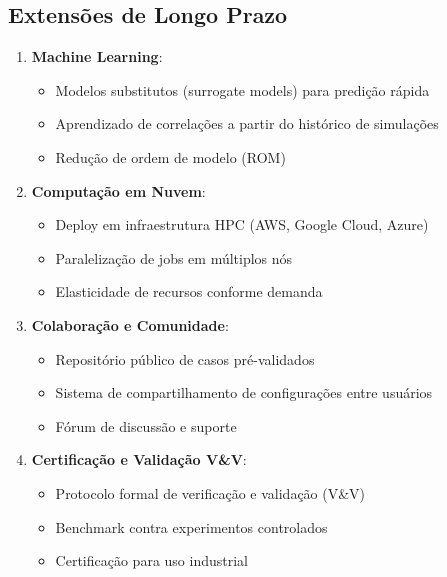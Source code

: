 \subsection{Extensões de Longo Prazo}

\begin{enumerate}
    \item \textbf{Machine Learning}:
    \begin{itemize}
        \item Modelos substitutos (surrogate models) para predição rápida
        \item Aprendizado de correlações a partir do histórico de simulações
        \item Redução de ordem de modelo (ROM)
    \end{itemize}
    
    \item \textbf{Computação em Nuvem}:
    \begin{itemize}
        \item Deploy em infraestrutura HPC (AWS, Google Cloud, Azure)
        \item Paralelização de jobs em múltiplos nós
        \item Elasticidade de recursos conforme demanda
    \end{itemize}
    
    \item \textbf{Colaboração e Comunidade}:
    \begin{itemize}
        \item Repositório público de casos pré-validados
        \item Sistema de compartilhamento de configurações entre usuários
        \item Fórum de discussão e suporte
    \end{itemize}
    
    \item \textbf{Certificação e Validação V\&V}:
    \begin{itemize}
        \item Protocolo formal de verificação e validação (V\&V)
        \item Benchmark contra experimentos controlados
        \item Certificação para uso industrial
    \end{itemize}
\end{enumerate}


